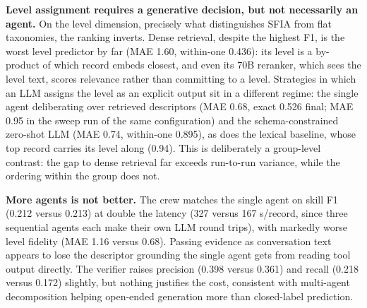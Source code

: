 \documentclass[conference]{IEEEtran}
\begin{document}
\textbf{Level assignment requires a generative decision, but not necessarily an agent.} On the level dimension, precisely what distinguishes SFIA from flat taxonomies, the ranking inverts. Dense retrieval, despite the highest F1, is the worst level predictor by far (MAE 1.60, within-one 0.436): its level is a by-product of which record embeds closest, and even its 70B reranker, which sees the level text, scores relevance rather than committing to a level. Strategies in which an LLM assigns the level as an explicit output sit in a different regime: the single agent deliberating over retrieved descriptors (MAE 0.68, exact 0.526 final; MAE 0.95 in the sweep run of the same configuration) and the schema-constrained zero-shot LLM (MAE 0.74, within-one 0.895), as does the lexical baseline, whose top record carries its level along (0.94). This is deliberately a group-level contrast: the gap to dense retrieval far exceeds run-to-run variance, while the ordering within the group does not.

\textbf{More agents is not better.} The crew matches the single agent on skill F1 (0.212 versus 0.213) at double the latency (327 versus 167 s/record, since three sequential agents each make their own LLM round trips), with markedly worse level fidelity (MAE 1.16 versus 0.68). Passing evidence as conversation text appears to lose the descriptor grounding the single agent gets from reading tool output directly. The verifier raises precision (0.398 versus 0.361) and recall (0.218 versus 0.172) slightly, but nothing justifies the cost, consistent with multi-agent decomposition helping open-ended generation more than closed-label prediction.
\end{document}
